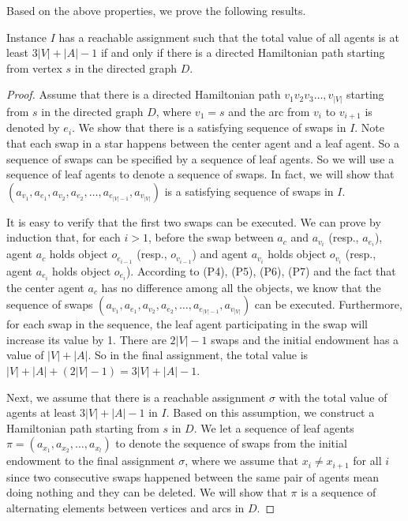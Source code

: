 Based on the above properties, we prove the following results.


\begin{lemma} \label{resultf}
    Instance $I$ has a reachable assignment such that the total value of all agents is at least $3|V|+|A|-1$ if and only if there is a directed Hamiltonian path starting from vertex $s$ in the directed graph $D$.
\end{lemma}

\begin{proof}

    Assume that there is a directed Hamiltonian path $v_1v_2v_3\dots,v_{|V|}$ starting from $s$ in the directed graph $D$, where $v_1=s$
    and the arc from $v_i$ to $v_{i+1}$ is denoted by $e_{i}$.
    We show that there is a satisfying sequence of swaps in $I$.
    Note that each swap in a star happens between the center agent and a leaf agent. So a sequence of swaps can
    be specified by a sequence of leaf agents. So we will use a sequence of leaf agents to denote a sequence of swaps.
    In fact, we will show that $(a_{v_1}, a_{e_1}, a_{v_2}, a_{e_2},\dots, a_{e_{|V|-1}}, a_{v_{|V|}})$ is a satisfying sequence of swaps in $I$.

    It is easy to verify that the first two swaps can be executed. We can prove by induction that, for each $i>1$, before the swap between $a_c$ and $a_{v_i}$ (resp., $a_{e_i}$), agent $a_c$ holds object $o_{e_{i-1}}$ (resp., $o_{v_{i-1}}$)  and  agent $a_{v_i}$ holds object $o_{v_i}$ (resp., agent $a_{e_i}$ holds object $o_{e_i}$).
    According to (P4), (P5), (P6), (P7) and the fact that the center agent $a_c$ has no difference among all the objects, we know that the sequence of swaps
     $(a_{v_1}, a_{e_1}, a_{v_2}, a_{e_2},\dots, a_{e_{|V|-1}}, a_{v_{|V|}})$ can be executed. Furthermore, for each swap in the sequence, the leaf agent participating in the swap will increase its value by 1. There are $2|V|-1$ swaps and the initial endowment has a value of $|V|+|A|$. So in the final assignment, the total value is $|V|+|A|+(2|V|-1)=3|V|+|A|-1$.

Next, we assume that there is a reachable assignment $\sigma$ with the total value of agents at least $3|V|+|A|-1$ in $I$.
Based on this assumption, we construct a Hamiltonian path starting from $s$ in $D$. We let a sequence of leaf agents $\pi=(a_{x_1},a_{x_2}, \dots, a_{x_l})$ to denote the sequence of swaps from the initial endowment to the final assignment $\sigma$, where we assume that $x_i\neq x_{i+1}$ for all $i$ since two consecutive swaps happened between the same pair of agents mean doing nothing and they can be deleted.
We will show that $\pi$ is a sequence of alternating elements between vertices and arcs in $D$.


\end{proof}
